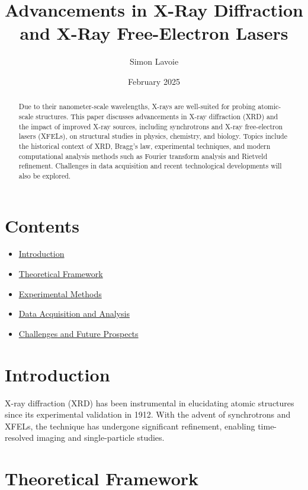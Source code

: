 \documentclass[aps,prb,twocolumn,superscriptaddress]{revtex4-2}
\begin{document}
\title{Advancements in X-Ray Diffraction and X-Ray Free-Electron Lasers}

\author{Simon Lavoie}
\date{February 2025}

\begin{abstract}
Due to their nanometer-scale wavelengths, X-rays are well-suited for probing
atomic-scale structures.  This paper discusses advancements in X-ray diffraction
(XRD) and the impact of improved X-ray sources, including synchrotrons and X-ray
free-electron lasers (XFELs), on structural studies in physics, chemistry, and
biology. Topics include the historical context of XRD, Bragg's law, experimental
techniques, and modern computational analysis methods such as Fourier transform
analysis and Rietveld refinement.  Challenges in data acquisition and recent
technological developments will also be explored.
\end{abstract}

\maketitle

\section*{Contents}
\begin{itemize}
    \item \hyperref[sec:intro]{Introduction}
    \item \hyperref[sec:theory]{Theoretical Framework}
    \item \hyperref[sec:experiment]{Experimental Methods}
    \item \hyperref[sec:data]{Data Acquisition and Analysis}
    \item \hyperref[sec:challenges]{Challenges and Future Prospects}
\end{itemize}

\section{Introduction} \label{sec:intro}
X-ray diffraction (XRD) has been instrumental in elucidating atomic structures
since its experimental validation in 1912.  With the advent of synchrotrons and
XFELs, the technique has undergone significant refinement, enabling
time-resolved imaging and single-particle studies.

\section{Theoretical Framework} \label{sec:theory}
\end{document}
